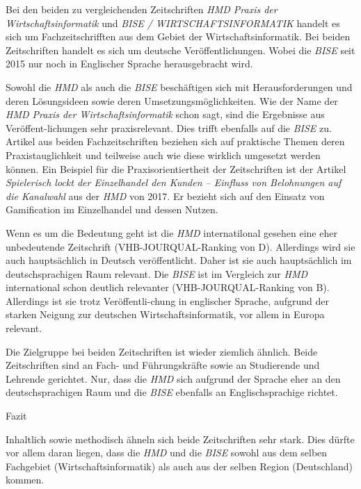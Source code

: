 \documentclass[12pt,utf8]{scrartcl}
\begin{document}
\begin{flushleft}
Bei den beiden zu vergleichenden Zeitschriften \emph{HMD Praxis der Wirtschaftsinformatik} und \emph{BISE / WIRTSCHAFTSINFORMATIK} handelt es sich um Fachzeitschrifften aus dem Gebiet der Wirtschaftsinformatik. Bei beiden Zeitschriften handelt es sich um deutsche Veröffentlichungen. Wobei die \emph{BISE} seit 2015 nur noch in Englischer Sprache herausgebracht wird\cite{BISE}.

Sowohl die \emph{HMD} als auch die \emph{BISE} beschäftigen sich mit Herausforderungen und deren Lösungsideen sowie deren Umsetzungsmöglichkeiten\cite{Meier2017}\cite{Stein2017}\cite{Ebert2017}. Wie der Name der \emph{HMD Praxis der Wirtschaftsinformatik} schon sagt, sind die Ergebnisse aus Veröffent-lichungen sehr praxisrelevant. Dies trifft ebenfalls auf die \emph{BISE} zu. Artikel aus beiden Fachzeitschriften beziehen sich auf praktische Themen deren Praxistauglichkeit und teilweise auch wie diese wirklich umgesetzt werden können\cite{Meier2017}\cite{Stein2017}\cite{Ebert2017}\cite{Kakar2017}. Ein Beispiel für die Praxisorientiertheit der Zeitschriften ist der Artikel \emph{Spielerisch lockt der Einzelhandel den Kunden – Einfluss von Belohnungen auf die Kanalwahl}\cite{Stein2017} aus der \emph{HMD} von 2017. Er bezieht sich auf den Einsatz von Gamification im Einzelhandel und dessen Nutzen. 

Wenn es um die Bedeutung geht ist die \emph{HMD} internatilonal gesehen eine eher unbedeutende Zeitschrift (VHB-JOURQUAL-Ranking von D)\cite{VHBJ}. Allerdings wird sie auch hauptsächlich in Deutsch veröffentlicht. Daher ist sie auch hauptsächlich im deutschsprachigen Raum relevant. 
Die \emph{BISE} ist im Vergleich zur \emph{HMD} international schon deutlich relevanter (VHB-JOURQUAL-Ranking von B)\cite{VHBJ}. Allerdings ist sie trotz Veröffentli-chung in englischer Sprache, aufgrund der starken Neigung zur deutschen Wirtschaftsinformatik, vor allem in Europa relevant. 

Die Zielgruppe bei beiden Zeitschriften ist wieder ziemlich ähnlich. Beide Zeitschriften sind an Fach- und Führungskräfte sowie an Studierende und Lehrende gerichtet. Nur, dass die \emph{HMD} sich aufgrund der Sprache eher an den deutschsprachigen Raum und die \emph{BISE} ebenfalls an Englischsprachige richtet.
\newline
\newline

{\Large Fazit}

Inhaltlich sowie methodisch ähneln sich beide Zeitschriften sehr stark. Dies dürfte vor allem daran liegen, dass die \emph{HMD} und die \emph{BISE} sowohl aus dem selben Fachgebiet (Wirtschaftsinformatik) als auch aus der selben Region (Deutschland) kommen.


\end{flushleft}
\end{document}
